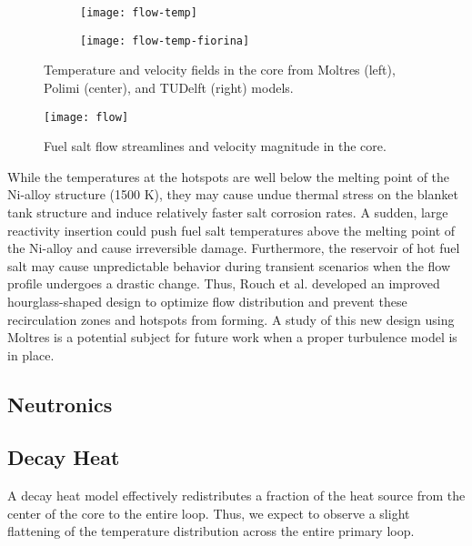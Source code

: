 \begin{figure}[htb!]
    \centering
    \begin{subfigure}[t]{.37\textwidth}
        \centering
        \texttt{[image: flow-temp]}
    \end{subfigure}
    \hfill
    \begin{subfigure}[t]{.625\textwidth}
        \centering
        \texttt{[image: flow-temp-fiorina]}
    \end{subfigure}
    \caption{Temperature and velocity fields in the core from Moltres
    (left), Polimi (center), and TUDelft (right) models.}
    \label{fig:flow-temp}
\end{figure}

\begin{figure}[htb!]
    \centering
    \texttt{[image: flow]}
    \caption{Fuel salt flow streamlines and velocity magnitude in the core.}
    \label{fig:flow}
\end{figure}

While the temperatures at the hotspots are well below the melting point of the
Ni-alloy structure (1500 K), they may cause undue thermal stress on the
blanket tank structure and induce relatively faster salt corrosion rates. A
sudden, large reactivity insertion could push fuel salt temperatures above the
melting point of the Ni-alloy and cause irreversible damage. Furthermore,
the reservoir of hot fuel salt may cause unpredictable behavior during
transient scenarios when the flow profile undergoes a drastic change.
Thus, Rouch et al. \cite{rouch_preliminary_2014} developed an improved
hourglass-shaped design to optimize flow distribution and prevent these
recirculation zones and hotspots from forming. A study of this new design
using Moltres is a potential subject for future work when a proper turbulence
model is in place.

\subsection{Neutronics}



\subsection{Decay Heat}

A decay heat model effectively redistributes a fraction of the heat source
from the center of the core to the entire loop. Thus, we expect to observe
a slight flattening of the temperature distribution across the entire primary
loop.

